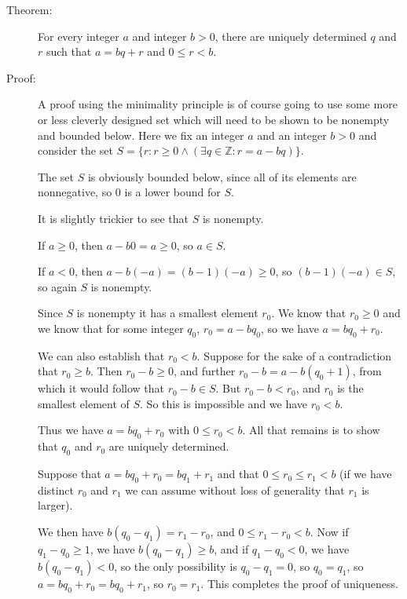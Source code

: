 \documentclass[12pt]{article}
\begin{document}
\begin{description}

\item[Theorem:]  For every integer $a$ and integer $b>0$, there are uniquely determined $q$ and $r$ such that
$a = bq+r$ and $0 \leq r <b$.

\item[Proof:]  A proof using the minimality principle is of course going to use some more or less cleverly designed set which will need to be shown to be nonempty and bounded below.  Here we fix an integer $a$ and an integer $b>0$ and consider the set $S = \{r:r \geq 0 \wedge (\exists q \in \mathbb Z:r = a-bq)\}$.

The set $S$ is obviously bounded below, since all of its elements are nonnegative, so 0 is a lower bound for $S$.

It is slightly trickier to see that $S$ is nonempty.  

If $a \geq 0$, then $a-b0 = a \geq 0$, so $a \in S$.

If $a <0$, then $a - b(-a) = (b-1)(-a) \geq 0$, so $(b-1)(-a) \in S$, so again $S$ is nonempty.

Since $S$ is nonempty it has a smallest element $r_0$.  We know that $r_0 \geq 0$ and we know that for some integer $q_0$, $r_0 = a - bq_0$, so we have $a = bq_0 + r_0$.  

We can also establish that $r_0 < b$.  Suppose for the sake of a contradiction that $r_0 \geq b$.  Then
$r_0 - b \geq 0$, and further $r_0 - b = a - b(q_0+1)$, from which it would follow that $r_0 -b \in S$.  But $r_0 - b < r_0$,
and $r_0$ is the smallest element of $S$.  So this is impossible and we have $r_0 < b$.

Thus we have $a=bq_0 + r_0$ with $0 \leq r_0 < b$.  All that remains is to show that $q_0$ and $r_0$ are uniquely determined.

Suppose that $a = bq_0 + r_0 = bq_1 + r_1$ and that $0 \leq r_0 \leq r_1 < b$  (if we have distinct $r_0$ and $r_1$ we can assume without loss of generality that $r_1$ is larger).

We then have $b(q_0 - q_1) = r_1 - r_0$, and $0 \leq r_1 - r_0 < b$.  Now if $q_1-q_0 \geq 1$, we have $b(q_0-q_1) \geq b$, and if $q_1-q_0 <0$, we have $b(q_0 - q_1) <0$, so the only possibility is $q_0 - q_1=0$, so $q_0 = q_1$,
so $a = bq_0 + r_0 = bq_0 + r_1$, so $r_0=r_1$.  This completes the proof of uniqueness.

\end{description}
\end{document}

